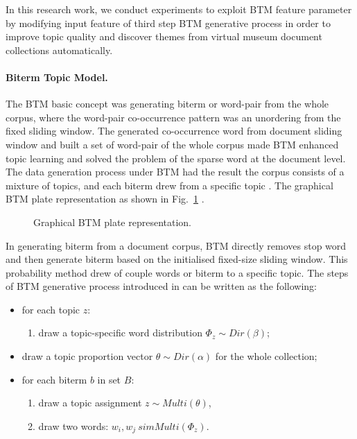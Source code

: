 In this research work, we conduct experiments to exploit BTM feature parameter by modifying input feature of third step BTM generative process in order to improve topic quality and discover themes from virtual museum document collections automatically.

\paragraph{Biterm Topic Model.} The BTM basic concept was generating biterm or word-pair from the whole corpus, where the word-pair co-occurrence pattern was an unordering from the fixed sliding window. The generated co-occurrence word from document sliding window and built a set of word-pair of the whole corpus made BTM enhanced topic learning and solved the problem of the sparse word at the document level. The data generation process under BTM had the result the corpus consists of a mixture of topics, and each biterm drew from a specific topic \cite{YanGuoLan,ChengYanLan}. The graphical BTM plate representation as shown in Fig.~\cref{fig:graphicalBTM} \cite{YanGuoLan}.

\begin{figure}[ht]
	\caption{Graphical BTM plate representation.}\label{fig:graphicalBTM}
\end{figure}

In generating biterm from a document corpus, BTM directly removes stop word and then generate biterm based on the initialised fixed-size sliding window. This probability method drew of couple words or biterm to a specific topic. The steps of BTM generative process introduced in \cite{YanGuoLan,ChengYanLan} can be written as the following:
\begin{itemize}
	\item for each topic \(z\):
	\begin{enumerate}
		\item draw a topic-specific word distribution \(\Phi_z \sim \textit{Dir}(\beta)\);
	\end{enumerate}
	\item draw a topic proportion vector \(\theta \sim \textit{Dir}(\alpha)\) for the whole collection;
	\item  for each biterm \(b\) in set \(B\):
	\begin{enumerate}
		\item draw a topic assignment \(z \sim \textit{Multi}(\theta)\),
		\item draw two words: \(w_i, w_j \ sim \textit{Multi}(\Phi_z)\).
	\end{enumerate}
\end{itemize}

